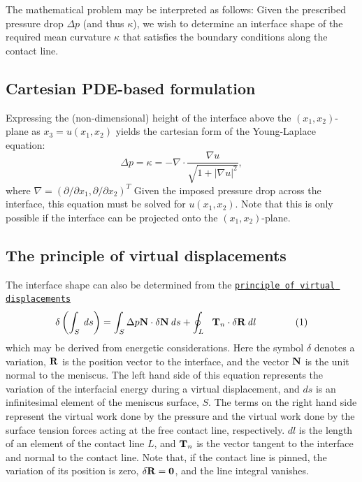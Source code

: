 The mathematical problem may be interpreted as follows\+: Given the prescribed pressure drop $ \Delta p $ (and thus $ \kappa $), we wish to determine an interface shape of the required mean curvature $ \kappa $ that satisfies the boundary conditions along the contact line.\hypertarget{index_cartesian}{}\subsection{Cartesian P\+D\+E-\/based formulation}\label{index_cartesian}
Expressing the (non-\/dimensional) height of the interface above the $ (x_1, x_2) $-\/plane as $ x_3 = u(x_1,x_2) $ yields the cartesian form of the Young-\/\+Laplace equation\+: \[ \Delta p = \kappa = - \nabla \cdot \frac{\nabla u}{\sqrt{1+|\nabla u|^2}}, \] where $ \nabla = (\partial/\partial x_1,\partial/\partial x_2)^T $ Given the imposed pressure drop across the interface, this equation must be solved for $ u(x_1, x_2) $. Note that this is only possible if the interface can be projected onto the $ (x_1, x_2) $-\/plane.\hypertarget{index_pvd}{}\subsection{The principle of virtual displacements}\label{index_pvd}
The interface shape can also be determined from the \href{http://en.wikipedia.org/wiki/Virtual_displacement}{\tt principle of virtual displacements} \[ \delta \left( \int_S \mathit{\, d} s \right)= \int_S \Delta p {\bf N} \cdot \delta {\bf N} \mathit{\, d} s + \oint_{L} \ \ {\bf T}_n \cdot \delta {\bf R } \mathit{\, d} l \ \ \ \ \ \ \ \ \ \ \ \ (1) \] which may be derived from energetic considerations. Here the symbol $ \delta $ denotes a variation, $ {\bf R } $ is the position vector to the interface, and the vector $ {\bf N} $ is the unit normal to the meniscus. The left hand side of this equation represents the variation of the interfacial energy during a virtual displacement, and $ ds $ is an infinitesimal element of the meniscus surface, $S$. The terms on the right hand side represent the virtual work done by the pressure and the virtual work done by the surface tension forces acting at the free contact line, respectively. $ dl $ is the length of an element of the contact line $L$, and $ {\bf T}_n $ is the vector tangent to the interface and normal to the contact line. Note that, if the contact line is pinned, the variation of its position is zero, $ \delta {\bf R} = {\bf 0} $, and the line integral vanishes.

